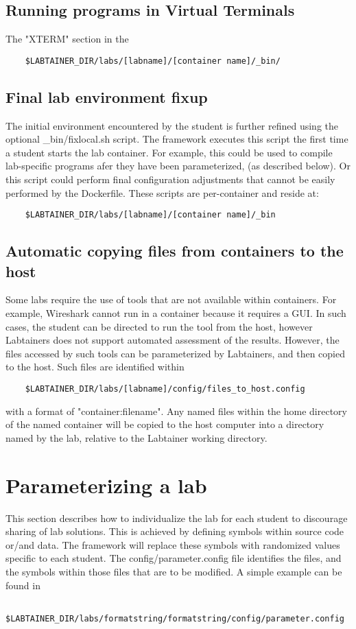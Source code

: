\documentclass[12pt]{article}
\begin{document}
\subsection {Running programs in Virtual Terminals}
The "XTERM" section in the 
\begin{verbatim}
    $LABTAINER_DIR/labs/[labname]/[container name]/_bin/
\end{verbatim}

\subsection{Final lab environment fixup}
The initial environment encountered by the student is further refined using
the optional \_bin/fixlocal.sh script.  The framework executes
this script the first time a student starts the lab container.  For example,
this could be used to compile lab-specific programs afer they have been parameterized,
(as described below).  Or this script could perform final configuration adjustments
that cannot be easily performed by the Dockerfile.  These scripts are per-container
and reside at:
\begin{verbatim}
    $LABTAINER_DIR/labs/[labname]/[container name]/_bin
\end{verbatim}

\subsection{Automatic copying files from containers to the host}
Some labs require the use of tools that are not available within containers. For example,
Wireshark cannot run in a container because it requires a GUI.  In such cases, the
student can be directed to run the tool from the host, however Labtainers does not support
automated assessment of the results.  However, the files accessed by such tools can be
parameterized by Labtainers, and then copied to the host.  Such files are identified within
\begin{verbatim}
    $LABTAINER_DIR/labs/[labname]/config/files_to_host.config
\end{verbatim}
\noindent with a format of "container:filename".  Any named files within the home directory of
the named container will be copied to the host computer into a directory named by the lab, relative
to the Labtainer working directory.

\section{Parameterizing a lab}
This section describes how to individualize the lab for each student to discourage
sharing of lab solutions.  This is achieved by defining symbols within source 
code or/and data.  The framework will replace these symbols with randomized values
specific to each student.  The config/parameter.config file identifies the files, and
the symbols within those files that are to be modified.  A simple example can be found in 
\begin{verbatim}
    $LABTAINER_DIR/labs/formatstring/formatstring/config/parameter.config
\end{verbatim}
\end{document}
